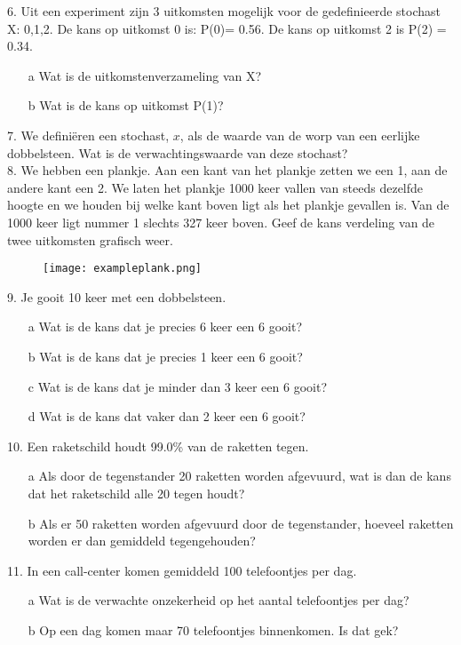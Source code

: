 6. Uit een experiment zijn 3 uitkomsten mogelijk voor de gedefinieerde stochast X: {0,1,2}. De kans op uitkomst 0 is: P(0)= 0.56. De kans op uitkomst 2 is P(2) = 0.34.
\begin{itemize}
\item[a] Wat is de uitkomstenverzameling van X?
\item[b] Wat is de kans op uitkomst P(1)?
\end{itemize}

  
7. We definiëren een stochast, $x$, als de waarde van de worp van een eerlijke dobbelsteen. Wat is de verwachtingswaarde van deze stochast? \\


8. We hebben een plankje. Aan een kant van het plankje zetten we een 1, aan de andere kant een 2. We laten het plankje 1000 keer vallen van steeds dezelfde hoogte en we houden bij welke kant boven ligt als het plankje gevallen is. Van de 1000 keer ligt nummer 1 slechts 327 keer boven. Geef de kans verdeling van de twee uitkomsten grafisch weer.\\

\begin{figure}[h!]
\centering
\texttt{[image: exampleplank.png]}
\end{figure}


9. Je gooit 10 keer met een dobbelsteen.
\begin{itemize}
\item[a] Wat is de kans dat je precies 6 keer een 6 gooit? 
\item[b] Wat is de kans dat je precies 1 keer een 6 gooit?
\item[c] Wat is de kans dat je minder dan 3 keer een 6 gooit?
\item[d] Wat is de kans dat vaker dan 2 keer een 6 gooit?
\end{itemize}


10. Een raketschild houdt 99.0\% van de raketten tegen. 
\begin{itemize}
\item[a] Als door de tegenstander 20 raketten worden afgevuurd, wat is dan de kans dat het raketschild alle 20 tegen houdt? 
\item[b] Als er 50 raketten worden afgevuurd door de tegenstander, hoeveel raketten worden er dan gemiddeld tegengehouden? 
\end{itemize}


11. In een call-center komen gemiddeld 100 telefoontjes per dag. 
\begin{itemize}
\item[a] Wat is de verwachte onzekerheid op het aantal telefoontjes per dag?
\item[b] Op een dag komen maar 70 telefoontjes binnenkomen. Is dat gek?
\end{itemize}


